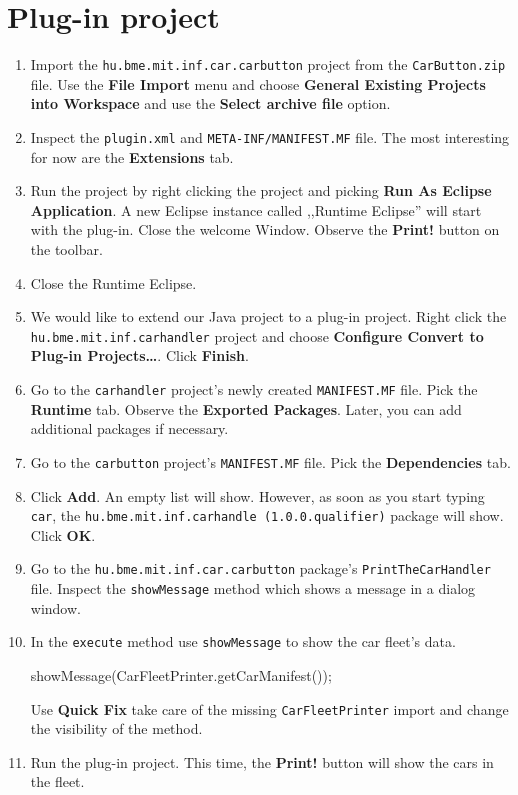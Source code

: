 \documentclass[]{report}
\newenvironment{Shaded}{}{}
\newcommand{\FunctionTok}[1]{\textcolor[rgb]{0.02,0.16,0.49}{{#1}}}
\newcommand{\NormalTok}[1]{{#1}}
\begin{document}
\section{Plug-in project}

\begin{enumerate}
\def\labelenumi{\arabic{enumi}.}
\item
  Import the \texttt{hu.bme.mit.inf.car.carbutton} project from the
  \texttt{CarButton.zip} file. Use the \textbf{File \textbar{} Import}
  menu and choose \textbf{General \textbar{} Existing Projects into
  Workspace} and use the \textbf{Select archive file} option.
\item
  Inspect the \texttt{plugin.xml} and \texttt{META-INF/MANIFEST.MF}
  file. The most interesting for now are the \textbf{Extensions} tab.
\item
  Run the project by right clicking the project and picking \textbf{Run
  As \textbar{} Eclipse Application}. A new Eclipse instance called
  ,,Runtime Eclipse'' will start with the plug-in. Close the welcome
  Window. Observe the \textbf{Print!} button on the toolbar.
\item
  Close the Runtime Eclipse.
\item
  We would like to extend our Java project to a plug-in project. Right
  click the \texttt{hu.bme.mit.inf.carhandler} project and choose
  \textbf{Configure \textbar{} Convert to Plug-in Projects\ldots{}}.
  Click \textbf{Finish}.
\item
  Go to the \texttt{carhandler} project's newly created
  \texttt{MANIFEST.MF} file. Pick the \textbf{Runtime} tab. Observe the
  \textbf{Exported Packages}. Later, you can add additional packages if
  necessary.
\item
  Go to the \texttt{carbutton} project's \texttt{MANIFEST.MF} file. Pick
  the \textbf{Dependencies} tab.
\item
  Click \textbf{Add}. An empty list will show. However, as soon as you
  start typing \texttt{car}, the
  \texttt{hu.bme.mit.inf.carhandle (1.0.0.qualifier)} package will show.
  Click \textbf{OK}.
\item
  Go to the \texttt{hu.bme.mit.inf.car.carbutton} package's
  \texttt{PrintTheCarHandler} file. Inspect the \texttt{showMessage}
  method which shows a message in a dialog window.
\item
  In the \texttt{execute} method use \texttt{showMessage} to show the
  car fleet's data.

\begin{Shaded}
\begin{Highlighting}[]
\FunctionTok{showMessage}\NormalTok{(CarFleetPrinter.}\FunctionTok{getCarManifest}\NormalTok{());}
\end{Highlighting}
\end{Shaded}

  Use \textbf{Quick Fix} take care of the missing
  \texttt{CarFleetPrinter} import and change the visibility of the
  method.
\item
  Run the plug-in project. This time, the \textbf{Print!} button will
  show the cars in the fleet.
\end{enumerate}
\end{document}

